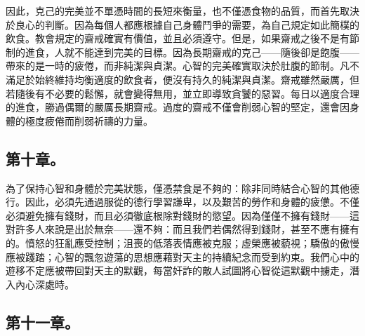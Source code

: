 因此，克己的完美並不單憑時間的長短來衡量，也不僅憑食物的品質，而首先取決於良心的判斷。因為每個人都應根據自己身體鬥爭的需要，為自己規定如此簡樸的飲食。教會規定的齋戒確實有價值，並且必須遵守。但是，如果齋戒之後不是有節制的進食，人就不能達到完美的目標。因為長期齋戒的克己——隨後卻是飽腹——帶來的是一時的疲倦，而非純潔與貞潔。心智的完美確實取決於肚腹的節制。凡不滿足於始終維持均衡適度的飲食者，便沒有持久的純潔與貞潔。齋戒雖然嚴厲，但若隨後有不必要的鬆懈，就會變得無用，並立即導致貪饕的惡習。每日以適度合理的進食，勝過偶爾的嚴厲長期齋戒。過度的齋戒不僅會削弱心智的堅定，還會因身體的極度疲倦而削弱祈禱的力量。\par


\subsection{第十章。}

\par

為了保持心智和身體於完美狀態，僅憑禁食是不夠的：除非同時結合心智的其他德行。因此，必須先通過服從的德行學習謙卑，以及艱苦的勞作和身體的疲憊。不僅必須避免擁有錢財，而且必須徹底根除對錢財的慾望。因為僅僅不擁有錢財——這對許多人來說是出於無奈——還不夠：而且我們若偶然得到錢財，甚至不應有擁有的。憤怒的狂亂應受控制；沮喪的低落表情應被克服；虛榮應被藐視；驕傲的傲慢應被踐踏；心智的飄忽遊蕩的思想應藉對天主的持續紀念而受到約束。我們心中的遊移不定應被帶回對天主的默觀，每當奸詐的敵人試圖將心智從這默觀中擄走，潛入內心深處時。\par


\subsection{第十一章。}

\par

